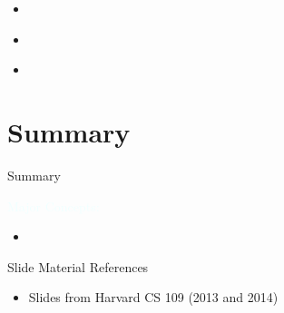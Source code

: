 \documentclass{beamer}
\newcommand{\tblue}[1]{{\Large {\textcolor{azure}{#1}}}}
\begin{document}
\begin{frame}{} 
    \begin{itemize}
        \item
    \end{itemize}
\end{frame}  


\begin{frame}{} 
    \begin{itemize}
        \item
    \end{itemize}
\end{frame}  


\begin{frame}{} 
    \begin{itemize}
        \item
    \end{itemize}
\end{frame}  



\section{Summary}

\begin{frame}{Summary}

\tblue{Major Concepts:}
\begin{itemize}
\item 
\end{itemize}
\end{frame}

\begin{frame}{Slide Material References}

\begin{itemize}
    \item Slides from Harvard CS 109 (2013 and 2014)
\end{itemize}
\end{frame}
\end{document}
